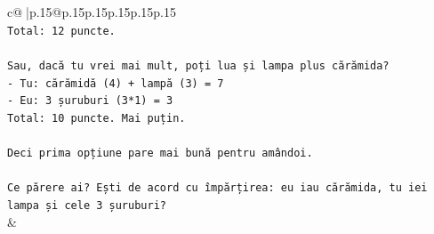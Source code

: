 \documentclass{article}
\begin{document}
{\begin{supertabular}{c@{$\;$}|p{.15\linewidth}@{}p{.15\linewidth}p{.15\linewidth}p{.15\linewidth}p{.15\linewidth}p{.15\linewidth}}
{{{\\ 
\texttt{Total: 12 puncte.} \\
\\ 
\texttt{Sau, dacă tu vrei mai mult, poți lua și lampa plus cărămida?} \\
\texttt{{-} Tu: cărămidă (4) + lampă (3) = 7} \\
\texttt{{-} Eu: 3 șuruburi (3*1) = 3} \\
\texttt{Total: 10 puncte. Mai puțin.} \\
\\ 
\texttt{Deci prima opțiune pare mai bună pentru amândoi.} \\
\\ 
\texttt{Ce părere ai? Ești de acord cu împărțirea: eu iau cărămida, tu iei lampa și cele 3 șuruburi?} \\
            }
        }
    }
    & \\ \\


\end{supertabular}}
\end{document}
